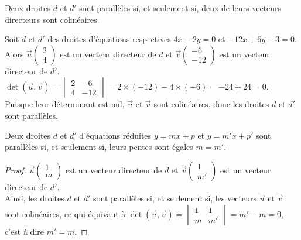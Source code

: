 \begin{Propriété}
Deux droites $d$ et $d'$ sont parallèles si, et seulement si, deux de leurs vecteurs directeurs sont colinéaires.
\end{Propriété}

\begin{Exemple}
Soit $d$ et $d'$ des droites d'équations respectives $4x-2y=0$ et $-12x+6y-3=0$. 
\\
Alors $\overrightarrow{u}\begin{pmatrix}
2\\
4
\end{pmatrix}$ est un vecteur directeur de $d$ et  $\overrightarrow{v}\begin{pmatrix}
-6\\
-12
\end{pmatrix}$ est un vecteur directeur de $d'$.\\
$\det(\overrightarrow{u},\overrightarrow{v})=\begin{vmatrix}
2 & -6\\
4 & -12
\end{vmatrix}=2\times (-12)-4\times(-6)=-24+24=0$. \\
Puisque leur déterminant est nul, $\overrightarrow{u}$ et $\overrightarrow{v}$ sont colinéaires, donc les droites $d$ et $d'$ sont parallèles. 

\end{Exemple}

\begin{Propriété}
Deux droites $d$ et $d'$ d'équations réduites $y=mx+p$ et $y=m'x+p'$ sont parallèles si, et seulement si, leurs pentes sont égales $m=m'$.
\end{Propriété}
\vspace{-0.5cm}
\begin{proof}
$\overrightarrow{u}\begin{pmatrix}
1\\
m
\end{pmatrix}$ est un vecteur directeur de $d$ et  $\overrightarrow{v}\begin{pmatrix}
1\\
m'
\end{pmatrix}$ est un vecteur directeur de $d'$.\\
Ainsi, les droites $d$ et $d'$ sont parallèles si, et seulement si, les vecteurs $\overrightarrow{u}$ et $\overrightarrow{v}$ sont colinéaires, ce qui équivaut à $\det(\overrightarrow{u},\overrightarrow{v})=\begin{vmatrix}
1 & 1\\
m & m'
\end{vmatrix}= m'-m=0$, c'est à dire $m'=m$. 
\end{proof}

